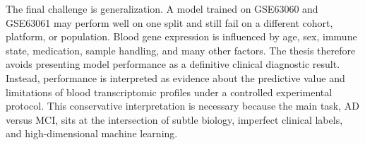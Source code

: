 The final challenge is generalization. A model trained on GSE63060 and GSE63061 may perform well on one split and still fail on a different cohort, platform, or population. Blood gene expression is influenced by age, sex, immune state, medication, sample handling, and many other factors. The thesis therefore avoids presenting model performance as a definitive clinical diagnostic result. Instead, performance is interpreted as evidence about the predictive value and limitations of blood transcriptomic profiles under a controlled experimental protocol. This conservative interpretation is necessary because the main task, AD versus MCI, sits at the intersection of subtle biology, imperfect clinical labels, and high-dimensional machine learning.
